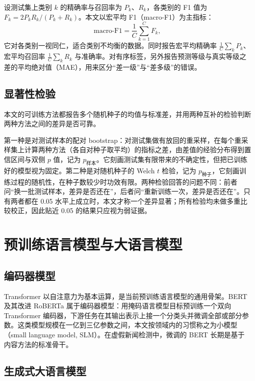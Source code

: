 设测试集上类别 $k$ 的精确率与召回率为 $P_k$、$R_k$，各类别的 F1 值为 $F_k=2P_kR_k/(P_k+R_k)$。本文以宏平均 F1（macro-F1）为主指标：
\begin{equation}
\text{macro-F1}=\frac{1}{C}\sum_{k=1}^{C}F_k ,
\end{equation}
它对各类别一视同仁，适合类别不均衡的数据。同时报告宏平均精确率 $\frac1C\sum_kP_k$、宏平均召回率 $\frac1C\sum_kR_k$ 与准确率。对有序标签，另外报告预测等级与真实等级之差的平均绝对值（MAE），用来区分“差一级”与“差多级”的错误。

\subsection{显著性检验}

本文的可训练方法都报告多个随机种子的均值与标准差，并用两种互补的检验判断两种方法之间的差异是否可靠。

第一种是对测试样本的配对 bootstrap\citep{koehn2004statistical}：对测试集做有放回的重采样，在每个重采样集上计算两种方法（各自对种子取平均）的指标之差，由差值的经验分布得到置信区间与双侧 $p$ 值，记为 $p_{\text{样本}}$。它刻画测试集有限带来的不确定性，但把已训练好的模型视为固定。第二种是对随机种子的 Welch $t$ 检验，记为 $p_{\text{种子}}$，它刻画训练过程的随机性，在种子数较少时功效有限。两种检验回答的问题不同：前者问“换一批测试样本，差异是否还在”，后者问“重新训练一次，差异是否还在”。只有两者都在 0.05 水平上成立时，本文才称一个差异显著；所有检验均未做多重比较校正，因此贴近 0.05 的结果只应视为弱证据。

\section{预训练语言模型与大语言模型}\label{sec:bg-lm}

\subsection{编码器模型}

Transformer\citep{vaswani2017attention} 以自注意力为基本运算，是当前预训练语言模型的通用骨架。BERT\citep{devlin2019bert} 及其改进 RoBERTa\citep{liu2019roberta} 属于编码器模型：用掩码语言模型目标预训练一个双向 Transformer 编码器，下游任务在其输出表示上接一个分类头并微调全部或部分参数。这类模型规模在一亿到三亿参数之间，本文按领域内的习惯称之为小模型（small language model, SLM）。在虚假新闻检测中，微调的 BERT 长期是基于内容方法的标准骨干。

\subsection{生成式大语言模型}

